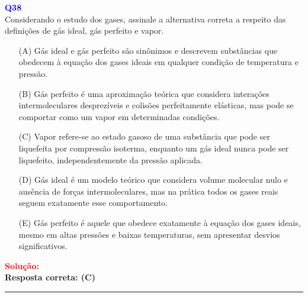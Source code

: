 \documentclass[a4paper,12pt]{article}
\begin{document}
\begin{flushleft}
\textbf{\textcolor{blue}{\Large Q38}}\\

Considerando o estudo dos gases, assinale a
alternativa correta a respeito das definições de
gás ideal, gás perfeito e vapor.

\begin{itemize}
    \item[(A)] Gás ideal e gás perfeito são sinônimos e
    descrevem substâncias que obedecem à
    equação dos gases ideais em qualquer condição
    de temperatura e pressão.
    \item[(B)] Gás perfeito é uma aproximação teórica que
    considera
    interações
    intermoleculares
    desprezíveis e colisões perfeitamente elásticas,
    mas pode se comportar como um vapor em
    determinadas condições.
    \item[(\colorbox{green!50}{C})] Vapor refere-se ao estado gasoso de uma
    substância que pode ser liquefeita por
    compressão isoterma, enquanto um gás ideal
    nunca pode ser liquefeito, independentemente da
    pressão aplicada.
    \item[(D)] Gás ideal é um modelo teórico que considera
    volume molecular nulo e ausência de forças
    intermoleculares, mas na prática todos os gases
    reais seguem exatamente esse comportamento.
    \item[(E)] Gás perfeito é aquele que obedece exatamente à
    equação dos gases ideais, mesmo em altas
    pressões e baixas temperaturas, sem apresentar
    desvios significativos.
\end{itemize}

\vspace{0.5cm}

\textcolor{red}{\textbf{Solução:}}\\

\textbf{Resposta correta: \colorbox{green!50}{(C)}}

\end{flushleft}
\noindent\rule{\linewidth}{0.6pt}\\
\end{document}
